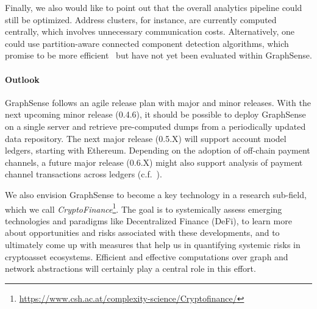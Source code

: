 Finally, we also would like to point out that the overall analytics pipeline could still be optimized. Address clusters, for instance, are currently computed centrally, which involves unnecessary communication costs. Alternatively, one could use partition-aware connected component detection algorithms, which promise to be more efficient~\cite{park:2020a} but have not yet been evaluated within GraphSense.

\paragraph{Outlook} GraphSense follows an agile release plan with major and minor releases. With the next upcoming minor release (0.4.6), it should be possible to deploy GraphSense on a single server and retrieve pre-computed dumps from a periodically updated data repository. The next major release (0.5.X) will support account model ledgers, starting with Ethereum. Depending on the adoption of off-chain payment channels, a future major release (0.6.X) might also support analysis of payment channel transactions across ledgers (c.f.~\cite{Romiti:2021a}).

We also envision GraphSense to become a key technology in a research sub-field, which we call \emph{CryptoFinance}\footnote{\url{https://www.csh.ac.at/complexity-science/Cryptofinance/}}. The goal is to systemically assess emerging technologies and paradigms like Decentralized Finance (DeFi), to learn more about opportunities and risks associated with these developments, and to ultimately come up with measures that help us in quantifying systemic risks in cryptoasset ecosystems. Efficient and effective computations over graph and network abstractions will certainly play a central role in this effort.

